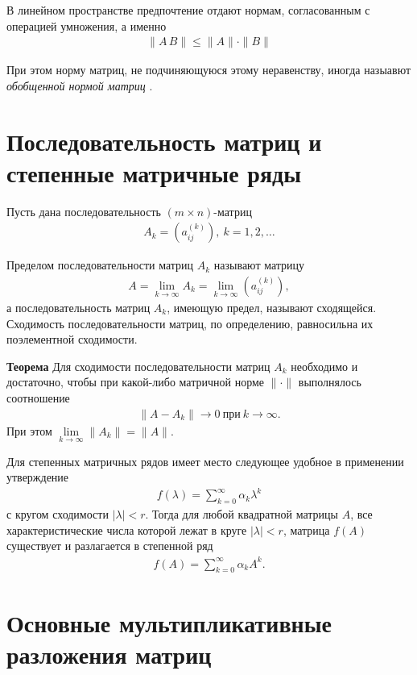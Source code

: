 \documentclass[%
	11pt,
	a4paper,
	utf8,
		]{article}
\begin{document}
В линейном пространстве предпочтение отдают нормам, согласованным с операцией умножения, а именно
\begin{align*}
	\| A \, B \| \leqslant \| A \| \cdot \| B \|
\end{align*}

При этом норму матриц, не подчиняющуюся этому неравенству, иногда назыавют \emph{обобщенной нормой матриц} \cite[]{shevtsov:linal-2012}.

\section{Последовательность матриц и степенные матричные ряды}

Пусть дана последовательность $ (m \times n) $-матриц
\begin{align*}
	A_k = (a_{ij}^{(k)}), \ k = 1, 2, \ldots
\end{align*}

Пределом последовательности матриц $ A_k $ называют матрицу
\begin{align*}
	A = \lim\limits_{k \to \infty} A_k = \lim\limits_{k \to \infty} (a_{ij}^{(k)}),
\end{align*}
а последовательность матриц $ A_k $, имеющую предел, называют сходящейся. Сходимость последовательности матриц, по определению, равносильна их поэлементной сходимости.

\textbf{Теорема} Для сходимости последовательности матриц $ A_k $ необходимо и достаточно, чтобы при какой-либо матричной норме $ \| \cdot \| $ выполнялось соотношение
\begin{align*}
	\| A - A_k \| \to 0 \ \text{при} \ k \to \infty.
\end{align*}
При этом $ \lim\limits_{k \to \infty} \| A_k \| = \| A \| $.

Для степенных матричных рядов имеет место следующее удобное в применении утверждение
\begin{align*}
	f(\lambda) = \sum_{k=0}^{\infty} \alpha_k \lambda^k
\end{align*}
с кругом сходимости $ |\lambda| < r $. Тогда для любой квадратной матрицы $ A $, все характеристические числа которой лежат в круге $ |\lambda| < r $, матрица $ f(A) $ существует и разлагается в степенной ряд
\begin{align*}
	f(A) = \sum_{k=0}^{\infty} \alpha_k A^k.
\end{align*}

\section{Основные мультипликативные разложения матриц}
\end{document}
